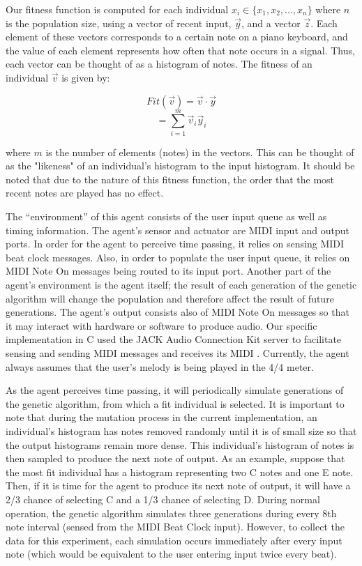 \documentclass[conference]{IEEEtran}
\begin{document}
Our fitness function is computed for each individual
$x_{i} \in \{x_{1},x_{2},...,x_{n}\} $ where $n$ is the population size, using
a vector of recent input, $\vec{y}$, and a vector $\vec{z}$. Each element of these
vectors corresponds to a certain note on a piano keyboard, and the value of
each element represents how often that note occurs in a signal. Thus, each vector
can be thought of as a histogram of notes. The fitness of an individual $\vec{v}$ is given by:

\[ Fit(\vec{v}) = \vec{v}\cdot\vec{y} \]
\[  = \sum_{i=1}^m \vec{v}_{i}\vec{y}_{i} \]

where $m$ is the number of elements (notes) in the vectors. This can be thought of as the "likeness" of an individual's histogram to
the input histogram. It should be noted that due to the nature of this fitness function, the order that the most recent notes are played has no effect.

The “environment” of this agent consists of the user input queue as well as timing information. The agent’s sensor and actuator are MIDI input and output ports. In order for the agent to perceive time passing, it relies on sensing MIDI beat clock messages. Also, in order to populate the user input queue, it relies on MIDI Note On messages being routed to its input port. Another part of the agent’s environment is the agent itself; the result of each generation of the genetic algorithm will change the population and therefore affect the result of future generations. The agent’s output consists also of MIDI Note On messages so that it may interact with hardware or software to produce audio. Our specific implementation in C used the JACK Audio Connection Kit server to facilitate sensing and sending MIDI messages and receives its MIDI . Currently, the agent always assumes that the user’s melody is being played in the 4/4 meter.

As the agent perceives time passing, it will periodically simulate generations of the genetic algorithm, from which a fit individual is selected. It is important to note that during the mutation process in the current implementation, an individual’s histogram has notes removed randomly until it is of small size so that the output histograms remain more dense. This individual’s histogram of notes is then sampled to produce the next note of output. As an example, suppose that the most fit individual has a histogram representing two C notes and one E note. Then, if it is time for the agent to produce its next note of output, it will have a 2/3  chance of selecting C and a 1/3 chance of selecting D.  During normal operation, the genetic algorithm simulates three generations during every 8th note interval (sensed from the MIDI Beat Clock input). However, to collect the data for this experiment, each simulation occurs immediately after every input note (which would be equivalent to the user entering input twice every beat). 
\end{document}
